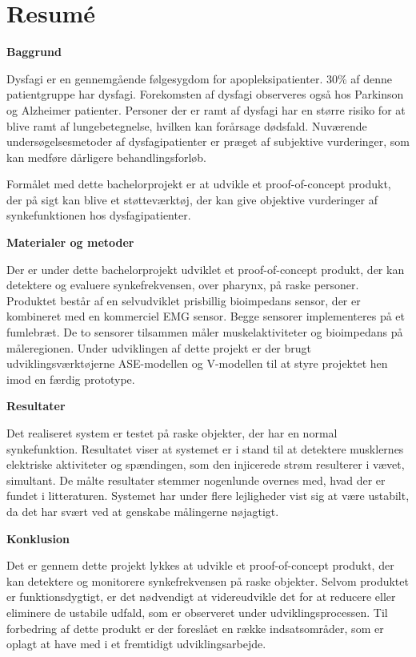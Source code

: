 \chapter{Resumé}

\textbf{Baggrund}

Dysfagi er en gennemgående følgesygdom for apopleksipatienter. 30\% af denne patientgruppe har dysfagi. Forekomsten af dysfagi observeres også hos Parkinson og Alzheimer patienter. Personer der er ramt af dysfagi har en større risiko for at blive ramt af lungebetegnelse, hvilken kan forårsage dødsfald. Nuværende undersøgelsesmetoder af dysfagipatienter er præget af subjektive vurderinger, som kan medføre dårligere behandlingsforløb. 

Formålet med dette bachelorprojekt er at udvikle et proof-of-concept produkt, der på sigt kan blive et støtteværktøj, der kan give objektive vurderinger af synkefunktionen hos dysfagipatienter. 

\textbf{Materialer og metoder }

Der er under dette bachelorprojekt udviklet et proof-of-concept produkt, der kan detektere og evaluere synkefrekvensen, over pharynx, på raske personer. Produktet består af en selvudviklet prisbillig bioimpedans sensor, der er kombineret med en kommerciel EMG sensor. Begge sensorer implementeres på et fumlebræt. De to sensorer tilsammen måler muskelaktiviteter og bioimpedans på måleregionen. Under udviklingen af dette projekt er der brugt udviklingsværktøjerne ASE-modellen og V-modellen til at styre projektet hen imod en færdig prototype. 

\textbf{Resultater}

Det realiseret system er testet på raske objekter, der har en normal synkefunktion. Resultatet viser at systemet er i stand til at detektere musklernes elektriske aktiviteter og spændingen, som den injicerede strøm resulterer i vævet, simultant. De målte resultater stemmer nogenlunde overnes med, hvad der er fundet i litteraturen. Systemet har under flere lejligheder vist sig at være ustabilt, da det har svært ved at genskabe målingerne nøjagtigt. 

\textbf{Konklusion}

Det er gennem dette projekt lykkes at udvikle et proof-of-concept produkt, der kan detektere og monitorere synkefrekvensen på raske objekter. Selvom produktet er funktionsdygtigt, er det nødvendigt at videreudvikle det for at reducere eller eliminere de ustabile udfald, som er observeret under udviklingsprocessen. Til forbedring af dette produkt er der foreslået en række indsatsområder, som er oplagt at have med i et fremtidigt udviklingsarbejde.



